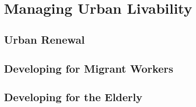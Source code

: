 \documentclass[../../main]{subfiles}
\begin{document}
\section{Managing Urban Livability}

\subsection{Urban Renewal}

	\begin{description}
	\end{description}

\subsection{Developing for Migrant Workers}

	\begin{description}
	\end{description}

\subsection{Developing for the Elderly}

	\begin{description}
	\end{description}
\end{document}
